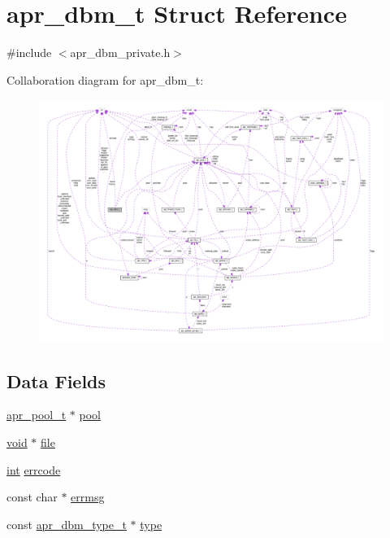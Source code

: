 \hypertarget{structapr__dbm__t}{}\section{apr\+\_\+dbm\+\_\+t Struct Reference}
\label{structapr__dbm__t}


{\ttfamily \#include $<$apr\+\_\+dbm\+\_\+private.\+h$>$}



Collaboration diagram for apr\+\_\+dbm\+\_\+t\+:
\nopagebreak
\begin{figure}[H]
\begin{center}
\leavevmode
\includegraphics[width=350pt]{structapr__dbm__t__coll__graph}
\end{center}
\end{figure}
\subsection*{Data Fields}
\begin{DoxyCompactItemize}
\item 
\hyperlink{structapr__pool__t}{apr\+\_\+pool\+\_\+t} $\ast$ \hyperlink{structapr__dbm__t_af80b38e28d1504e98f9aa3308285bf9b}{pool}
\item 
\hyperlink{group__MOD__ISAPI_gacd6cdbf73df3d9eed42fa493d9b621a6}{void} $\ast$ \hyperlink{structapr__dbm__t_a228e2548b3a034d8d16451af4b93f3f1}{file}
\item 
\hyperlink{pcre_8txt_a42dfa4ff673c82d8efe7144098fbc198}{int} \hyperlink{structapr__dbm__t_a130a628921f4c46241d09476f8a3090c}{errcode}
\item 
const char $\ast$ \hyperlink{structapr__dbm__t_adc3defc90b90fe3411c099631f75a653}{errmsg}
\item 
const \hyperlink{structapr__dbm__type__t}{apr\+\_\+dbm\+\_\+type\+\_\+t} $\ast$ \hyperlink{structapr__dbm__t_a27287213e7ebe16d9945207a13300faf}{type}
\end{DoxyCompactItemize}


